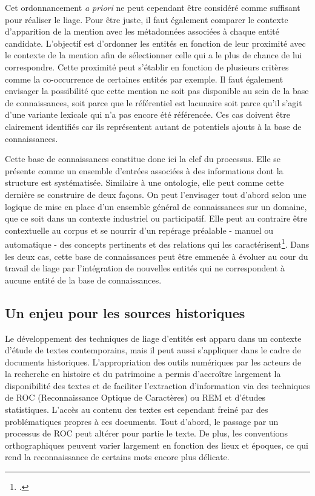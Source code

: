 \documentclass[a4paper,12pt,twoside]{book}
\begin{document}
	Cet ordonnancement \textit{a priori} ne peut cependant être considéré comme suffisant pour réaliser le liage. Pour être juste, il faut également comparer le contexte d'apparition de la mention avec les métadonnées associées à chaque entité candidate. L'objectif est d'ordonner les entités en fonction de leur proximité avec le contexte de la mention afin de sélectionner celle qui a le plus de chance de lui correspondre. Cette proximité peut s'établir en fonction de plusieurs critères comme la co-occurrence de certaines entités par exemple. Il faut également envisager la possibilité que cette mention ne soit pas disponible au sein de la base de connaissances, soit parce que le référentiel est lacunaire soit parce qu'il s'agit d'une variante lexicale qui n'a pas encore été référencée. Ces cas doivent être clairement identifiés car ils représentent autant de potentiels ajouts à la base de connaissances.
	
	Cette base de connaissances constitue donc ici la clef du processus. Elle se présente comme un ensemble d'entrées associées à des informations dont la structure est systématisée. Similaire à une ontologie, elle peut comme cette dernière se construire de deux façons. On peut l'envisager tout d'abord selon une logique de mise en place d'un ensemble général de connaissances sur un domaine, que ce soit dans un contexte industriel ou participatif. Elle peut au contraire être contextuelle au corpus et se nourrir d'un repérage préalable - manuel ou automatique - des concepts pertinents et des relations qui les caractérisent\footcite[p. 33]{stern_identification_2013}. Dans les deux cas, cette base de connaissances peut être emmenée à évoluer au cour du travail de liage par l'intégration de nouvelles entités qui ne correspondent à aucune entité de la base de connaissances.
	
	\subsection{Un enjeu pour les sources historiques}
	
	Le développement des techniques de liage d'entités est apparu dans un contexte d'étude de textes contemporains, mais il peut aussi s'appliquer dans le cadre de documents historiques. L'appropriation des outils numériques par les acteurs de la recherche en histoire et du patrimoine a permis d'accroître largement la disponibilité des textes et de faciliter l'extraction d'information via des techniques de ROC (Reconnaissance Optique de Caractères) ou REM et d'études statistiques. L'accès au contenu des textes est cependant freiné par des problématiques propres à ces documents. Tout d'abord, le passage par un processus de ROC peut altérer pour partie le texte. De plus, les conventions orthographiques peuvent varier largement en fonction des lieux et époques, ce qui rend la reconnaissance de certains mots encore plus délicate.
	
\end{document}
